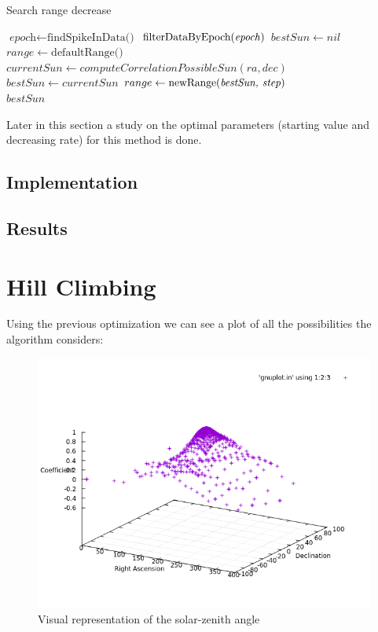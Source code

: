\begin{algorithm}
	\caption{Search range decrease}\label{searchRangeDecrease}
	\begin{algorithmic}[1]
		\State $\textit{epoch} \gets \text{findSpikeInData()}$ 
		\State $\text{filterDataByEpoch(\textit{epoch})}$
		\State $bestSun \gets nil$
		\State $range \gets \text{defaultRange()}$ 
		\State $currentSun \gets computeCorrelationPossibleSun(ra, dec)$
		\State $bestSun \gets currentSun$
		\State $range \gets \text{newRange(\textit{bestSun, step})}$ 
		\EndIf
		\EndFor
		\EndFor
		\EndFor
		\\
		\Return $bestSun$
		\EndProcedure
	\end{algorithmic}
\end{algorithm}

Later in this section a study on the optimal parameters (starting value and decreasing rate) for this method is done. 

\subsection{Implementation}

\subsection{Results}

\clearpage

\section{Hill Climbing}

Using the previous optimization we can see a plot of all the possibilities the algorithm considers:

\begin{figure}[!htb]
	\begin{centering}
		\includegraphics[width=0.6\linewidth]{images/ch6/hillClimbing/resultsAll.png}
		\caption{Visual representation of the solar-zenith angle}
		\label{fig:solar-zenith-angle}
	\end{centering}
\end{figure}

